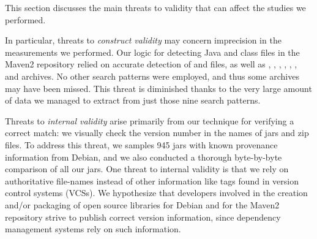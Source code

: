 This section discusses the main threats to validity that can affect the
studies we performed.

In particular, threats to {\em construct validity} may concern imprecision
in the measurements we performed. Our logic for detecting Java and class
files in the Maven2 repository relied on accurate detection of
 and  files, as well as ,
, ,
, , , and 
archives.  No other search patterns were employed, and thus some archives
may have been missed.  This threat is diminished thanks to the very large
amount of data we managed to extract from just those nine search patterns.


Threats to {\em internal validity} arise primarily from our technique for
verifying a correct match: we visually check the version number in the
names of jars and zip files.  To address this threat, we samples 945 jars
with known provenance information from Debian, and we also conducted a
thorough byte-by-byte comparison of all our jars.
One threat to internal validity is that we rely on authoritative file-names
instead of other information like tags found in version control systems
(VCSs).
We hypothesize that developers involved in the creation and/or packaging of
open source libraries for Debian and for the Maven2 repository strive to
publish correct version information, since dependency management systems
rely on such information.


